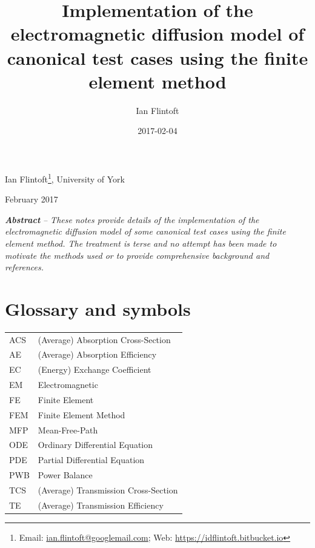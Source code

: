 \documentclass[a4paper]{article}
\title{Implementation of the electromagnetic diffusion model of canonical test cases using the finite element method}
\author{Ian Flintoft}
\date{2017-02-04}
\numberwithin{equation}{section}
\begin{document}
\clearpage{}
\vspace{5mm}
{\centering\large 
Ian Flintoft\footnote{ Email: \href{mailto:ian.flintoft@googlemail.com}{ian.flintoft@googlemail.com}; 
Web: \url{https://idflintoft.bitbucket.io}}, University of York
\par}
\vspace{5mm}
{ February 2017
\par}
\vspace{5mm}
\textbf{\textit{Abstract}}\textit{ -- These notes provide details of the implementation of the 
electromagnetic diffusion model of some canonical test cases using the finite element method.
The treatment is terse and no attempt has been made to motivate the methods used or to provide
comprehensive background and references. 
}
%
\setcounter{tocdepth}{3}
\renewcommand\contentsname{Contents}
\tableofcontents
%

\section[Glossary and symbols]{Glossary and symbols}
\label{sc:gloss}

\begin{supertabular}{m{2cm}l}
ACS              & (Average) Absorption Cross-Section  \\
AE               &(Average) Absorption Efficiency      \\
EC               &(Energy) Exchange Coefficient        \\
EM               &Electromagnetic                      \\
FE               &Finite Element                       \\
FEM              &Finite Element Method                \\
MFP              &Mean-Free-Path                       \\
ODE              &Ordinary Differential Equation       \\
PDE              &Partial Differential Equation        \\
PWB              &Power Balance                        \\
TCS              &(Average) Transmission Cross-Section \\
TE               &(Average) Transmission Efficiency    \\
\end{supertabular}
\vspace{5mm}
\end{document}
